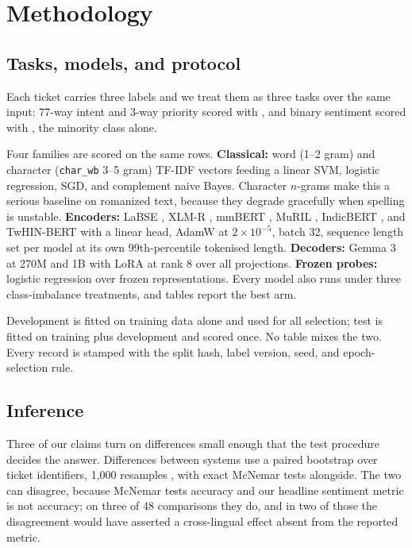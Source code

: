 \section{Methodology}
\label{sec:method}

\subsection{Tasks, models, and protocol}

Each ticket carries three labels and we treat them as three tasks over the same
input: 77-way intent and 3-way priority scored with \macrof{}, and binary
sentiment scored with \negf{}, the minority class alone.

Four families are scored on the same rows. \textbf{Classical:} word (1--2 gram)
and character (\texttt{char\_wb} 3--5 gram) TF-IDF vectors feeding a linear SVM,
logistic regression, SGD, and complement naive Bayes. Character $n$-grams make
this a serious baseline on romanized text, because they degrade gracefully when
spelling is unstable. \textbf{Encoders:} LaBSE \cite{feng2022labse}, XLM-R
\cite{conneau2020xlmr}, mmBERT \cite{marone2025mmbert}, MuRIL
\cite{khanuja2021muril}, IndicBERT \cite{kakwani2020indicnlpsuite}, and
TwHIN-BERT \cite{zhang2023twhinbert} with a linear head, AdamW at
$2\times10^{-5}$, batch 32, sequence length set per model at its own
99th-percentile tokenised length. \textbf{Decoders:} Gemma 3 at 270M and 1B
\cite{gemmateam2025gemma3} with LoRA \cite{hu2022lora} at rank 8 over all
projections. \textbf{Frozen probes:} logistic regression over frozen
representations. Every model also runs under three class-imbalance treatments,
and tables report the best arm.

Development is fitted on training data alone and used for all selection; test is
fitted on training plus development and scored once. No table mixes the two.
Every record is stamped with the split hash, label version, seed, and
epoch-selection rule.

\subsection{Inference}

Three of our claims turn on differences small enough that the test procedure
decides the answer. Differences between systems use a paired bootstrap over
ticket identifiers, 1{,}000 resamples \cite{koehn2004bootstrap}, with exact
McNemar tests \cite{mcnemar1947} alongside. The two can disagree, because
McNemar tests accuracy and our headline sentiment metric is not accuracy; on
three of 48 comparisons they do, and in two of those the disagreement would have
asserted a cross-lingual effect absent from the reported metric.

